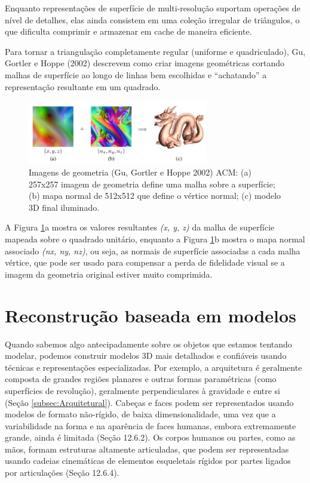 \documentclass{article}
\begin{document}
Enquanto representações de superfície de multi-resolução suportam operações de nível de detalhes, elas ainda consistem em uma coleção irregular de triângulos, o que dificulta comprimir e armazenar em cache de maneira eficiente.

Para tornar a triangulação completamente regular (uniforme e quadriculado), Gu, Gortler e Hoppe (2002) descrevem como criar imagens geométricas cortando malhas de superfície ao longo de linhas bem escolhidas e “achatando” a representação resultante em um quadrado.

\begin{figure}[!htb]
    \centering
    \includegraphics[width=0.7\textwidth]{imagemDeGeometria.jpg}
    \caption{Imagens de geometria (Gu, Gortler e Hoppe 2002) ACM: (a) 257x257 imagem de geometria define uma malha sobre a superfície; (b) mapa normal de 512x512 que define o vértice normal; (c) modelo 3D final iluminado.}
    \label{fig:imagemGeometria}
\end{figure}

A Figura \ref{fig:imagemGeometria}a mostra os valores resultantes \textit{(x, y, z)} da malha de superfície mapeada sobre o quadrado unitário, enquanto a Figura \ref{fig:imagemGeometria}b mostra o mapa normal associado \textit{(nx, ny, nz)}, ou seja, as normais de superfície associadas a cada malha vértice, que pode ser usado para compensar a perda de fidelidade visual se a imagem da geometria original estiver muito comprimida.

\section{Reconstrução baseada em modelos}
Quando sabemos algo antecipadamente sobre os objetos que estamos tentando modelar, podemos construir modelos 3D mais detalhados e confiáveis usando técnicas e representações especializadas. Por exemplo, a arquitetura é geralmente composta de grandes regiões planares e outras formas paramétricas (como superfícies de revolução), geralmente perpendiculares à gravidade e entre si (Seção \ref{subsec:Arquitetural}). Cabeças e faces podem ser representados usando modelos de formato não-rígido, de baixa dimensionalidade, uma vez que a variabilidade na forma e na aparência de faces humanas, embora extremamente grande, ainda é limitada (Seção 12.6.2). Os corpos humanos ou partes, como as mãos, formam estruturas altamente articuladas, que podem ser representadas usando cadeias cinemáticas de elementos esqueletais rígidos por partes ligados por articulações (Seção 12.6.4).
\end{document}
